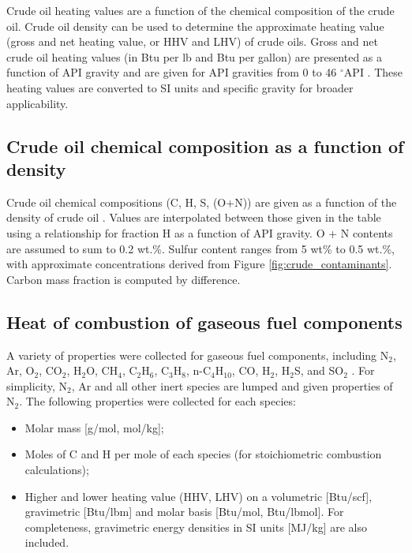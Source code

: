 \documentclass[11pt]{report}
\begin{document}
Crude oil heating values are a function of the chemical composition of the crude oil. Crude oil density can be used to determine the approximate heating value (gross and net heating value, or HHV and LHV) of crude oils. Gross and net crude oil heating values (in Btu per lb and Btu per gallon) are presented as a function of API gravity and are given for API gravities from 0 to 46 $^\circ$API \cite[Table 11]{Schmidt1985}. These heating values are converted to SI units and specific gravity for broader applicability.

\subsection{Crude oil chemical composition as a function of density}

Crude oil chemical compositions (C, H, S, (O+N)) are given as a function of the density of crude oil \cite[Table 9]{Schmidt1985}. Values are interpolated between those given in the table using a relationship for fraction H as a function of API gravity. O + N contents are assumed to sum to 0.2 wt.\%. Sulfur content ranges from 5 wt\% to 0.5 wt.\%, with approximate concentrations derived from Figure \ref{fig:crude_contaminants}. Carbon mass fraction is computed by difference. 

\subsection{Heat of combustion of gaseous fuel components}

A variety of properties were collected for gaseous fuel components, including N$_2$, Ar, O$_2$, CO$_2$, H$_2$O, CH$_4$, C$_2$H$_6$, C$_3$H$_8$, n-C$_4$H$_{10}$, CO, H$_2$, H$_2$S, and SO$_2$ \cite[Chapter 17]{Kutz2006} \cite{Ganapathy2003}. For simplicity, N$_2$, Ar and all other inert species are lumped and given properties of N$_2$. The following properties were collected for each species:
\begin{itemize}
\item Molar mass [g/mol, mol/kg];
\item Moles of C and H per mole of each species (for stoichiometric combustion calculations);
\item Higher and lower heating value (HHV, LHV) on a volumetric [Btu/scf], gravimetric [Btu/lbm] and molar basis [Btu/mol, Btu/lbmol]. For completeness, gravimetric energy densities in SI units [MJ/kg] are also included.
\end{itemize} 
\end{document}
